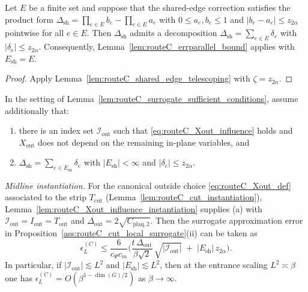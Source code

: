 \begin{corollary}
\label{cor:routeC_shared_edge_decomp_from_telescoping}
Let $E$ be a finite set and suppose that the shared-edge correction satisfies the product form
\(
\Delta_{\mathrm{sh}}=\prod_{e\in E} b_e-\prod_{e\in E} a_e
\)
with $0\le a_e,b_e\le 1$ and $|b_e-a_e|\le z_{2\alpha}$ pointwise for all $e\in E$.
Then $\Delta_{\mathrm{sh}}$ admits a decomposition
\(
\Delta_{\mathrm{sh}}=\sum_{e\in E}\delta_e
\)
with $|\delta_e|\le z_{2\alpha}$.
Consequently, Lemma~\ref{lem:routeC_errparallel_bound} applies with $E_{\mathrm{sh}}=E$.
\end{corollary}

\begin{proof}
Apply Lemma~\ref{lem:routeC_shared_edge_telescoping} with $\zeta=z_{2\alpha}$.
\end{proof}


\begin{corollary}
\label{cor:routeC_surrogate_error_from_influences}
In the setting of Lemma~\ref{lem:routeC_surrogate_sufficient_conditions}, assume additionally that:
\begin{enumerate}[label=(\alph*)]
\item there is an index set $\mathcal I_{\mathrm{out}}$ such that \eqref{eq:routeC_Xout_influence} holds and
$X_{\mathrm{out}}$ does not depend on the remaining in-plane variables, and
\item $\Delta_{\mathrm{sh}}=\sum_{e\in E_{\mathrm{sh}}}\delta_e$ with $|E_{\mathrm{sh}}|<\infty$ and $|\delta_e|\le z_{2\alpha}$.
\end{enumerate}
\noindent\emph{Midline instantiation.} For the canonical outside choice \eqref{eq:routeC_Xout_def} associated to the strip $T_{\mathrm{cut}}$ (Lemma~\ref{lem:routeC_cut_instantiation}), Lemma~\ref{lem:routeC_Xout_influence_instantiation} supplies (a) with $\mathcal I_{\mathrm{out}}=I_{\mathrm{out}}=T_{\mathrm{out}}$ and $\Delta_{\mathrm{out}}=2\sqrt{C_{\mathrm{plaq},2}}$.
Then the surrogate approximation error in Proposition~\ref{ass:routeC_cut_local_surrogate}(ii) can be taken as
\begin{equation}\label{eq:routeC_epsC_explicit}
\epsilon_L^{(C)}
\le
\frac{6}{c_\Psi c_m}\Big(\frac{t\,\Delta_{\mathrm{out}}}{\beta\sqrt2}\,\sqrt{|\mathcal I_{\mathrm{out}}|}
\;+\;
|E_{\mathrm{sh}}|\,z_{2\alpha}\Big).
\end{equation}
In particular, if $|\mathcal I_{\mathrm{out}}|\lesssim L^2$ and $|E_{\mathrm{sh}}|\lesssim L^2$, then at the entrance scaling $L^2\asymp \beta$ one has
\(\epsilon_L^{(C)}=O(\beta^{1-\dim(G)/2})\) as $\beta\to\infty$.
\end{corollary}

